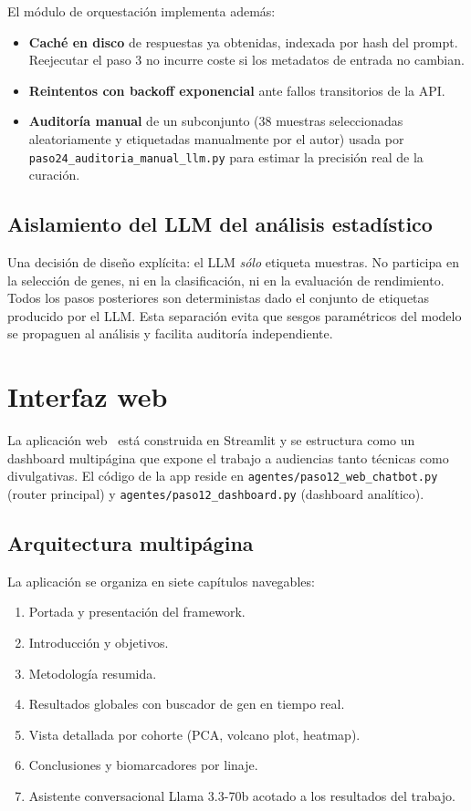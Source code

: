 El módulo de orquestación implementa además:

\begin{itemize}[leftmargin=1.2em]
  \item \textbf{Caché en disco} de respuestas ya obtenidas, indexada
  por hash del prompt. Reejecutar el paso 3 no incurre coste si los
  metadatos de entrada no cambian.
  \item \textbf{Reintentos con backoff exponencial} ante fallos
  transitorios de la API.
  \item \textbf{Auditoría manual} de un subconjunto (38 muestras
  seleccionadas aleatoriamente y etiquetadas manualmente por el autor)
  usada por \texttt{paso24\_auditoria\_manual\_llm.py} para estimar la
  precisión real de la curación.
\end{itemize}

\subsection{Aislamiento del LLM del análisis estadístico}

Una decisión de diseño explícita: el LLM \emph{sólo} etiqueta muestras.
No participa en la selección de genes, ni en la clasificación, ni en la
evaluación de rendimiento. Todos los pasos posteriores son
deterministas dado el conjunto de etiquetas producido por el LLM. Esta
separación evita que sesgos paramétricos del modelo se propaguen al
análisis y facilita auditoría independiente.

\section{Interfaz web \framework}
\label{sec:dev_interfaz}

La aplicación web \framework\ está construida en Streamlit y se
estructura como un dashboard multipágina que expone el trabajo a
audiencias tanto técnicas como divulgativas. El código de la app reside
en \texttt{agentes/paso12\_web\_chatbot.py} (router principal) y
\texttt{agentes/paso12\_dashboard.py} (dashboard analítico).

\subsection{Arquitectura multipágina}

La aplicación se organiza en siete capítulos navegables:

\begin{enumerate}[leftmargin=1.4em]
  \item Portada y presentación del framework.
  \item Introducción y objetivos.
  \item Metodología resumida.
  \item Resultados globales con buscador de gen en tiempo real.
  \item Vista detallada por cohorte (PCA, volcano plot, heatmap).
  \item Conclusiones y biomarcadores por linaje.
  \item Asistente conversacional Llama 3.3-70b acotado a los
  resultados del trabajo.
\end{enumerate}

